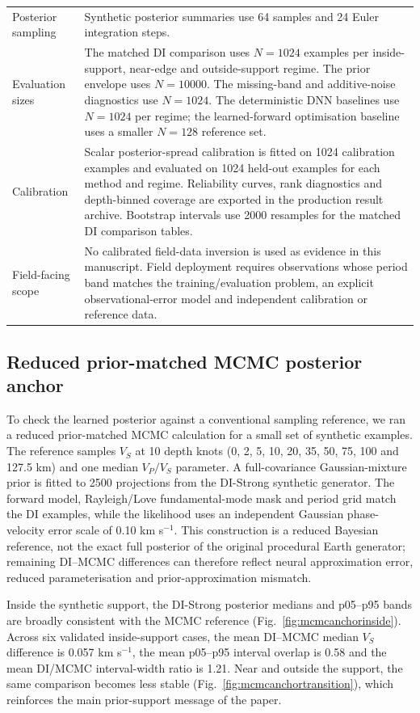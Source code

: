 \documentclass[referee]{gji}
\begin{document}
\begin{longtable}{@{}p{}p{}@{}}
Posterior sampling & Synthetic posterior summaries use 64 samples and 24 Euler integration steps. \\
Evaluation sizes & The matched DI comparison uses $N=1024$ examples per inside-support, near-edge and outside-support regime. The prior envelope uses $N=10000$. The missing-band and additive-noise diagnostics use $N=1024$. The deterministic DNN baselines use $N=1024$ per regime; the learned-forward optimisation baseline uses a smaller $N=128$ reference set. \\
Calibration & Scalar posterior-spread calibration is fitted on 1024 calibration examples and evaluated on 1024 held-out examples for each method and regime. Reliability curves, rank diagnostics and depth-binned coverage are exported in the production result archive. Bootstrap intervals use 2000 resamples for the matched DI comparison tables. \\
Field-facing scope & No calibrated field-data inversion is used as evidence in this manuscript. Field deployment requires observations whose period band matches the training/evaluation problem, an explicit observational-error model and independent calibration or reference data. \\
\end{longtable}
\normalsize

\subsection{Reduced prior-matched MCMC posterior anchor}

To check the learned posterior against a conventional sampling reference, we ran a reduced prior-matched MCMC calculation for a small set of synthetic examples. The reference samples $V_S$ at 10 depth knots (0, 2, 5, 10, 20, 35, 50, 75, 100 and 127.5 km) and one median $V_P/V_S$ parameter. A full-covariance Gaussian-mixture prior is fitted to 2500 projections from the DI-Strong synthetic generator. The forward model, Rayleigh/Love fundamental-mode mask and period grid match the DI examples, while the likelihood uses an independent Gaussian phase-velocity error scale of 0.10 km s$^{-1}$. This construction is a reduced Bayesian reference, not the exact full posterior of the original procedural Earth generator; remaining DI--MCMC differences can therefore reflect neural approximation error, reduced parameterisation and prior-approximation mismatch.

Inside the synthetic support, the DI-Strong posterior medians and p05--p95 bands are broadly consistent with the MCMC reference (Fig.~\ref{fig:mcmcanchorinside}). Across six validated inside-support cases, the mean DI--MCMC median $V_S$ difference is 0.057 km s$^{-1}$, the mean p05--p95 interval overlap is 0.58 and the mean DI/MCMC interval-width ratio is 1.21. Near and outside the support, the same comparison becomes less stable (Fig.~\ref{fig:mcmcanchortransition}), which reinforces the main prior-support message of the paper.
\end{document}
